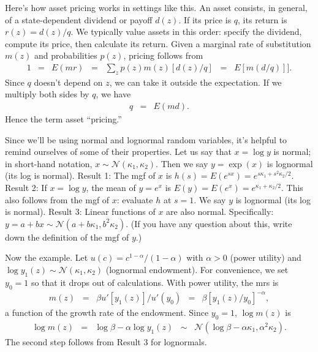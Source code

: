\documentclass[11pt]{article}
\begin{document}
Here's how asset pricing works in settings like this.
An asset consists, in general,
of a state-dependent dividend or payoff $d(z)$.
If its price is $q$, its return is $ r(z) = d(z)/q$.
We typically value assets in this order:
specify the dividend, compute its price, then calculate its return.
Given a marginal rate of substitution $m(z)$ and probabilities $p(z)$,
pricing follows from
\begin{eqnarray*}
    1 &=& E (mr) \;\;=\;\; \sum_z p(z) m(z) [d(z)/q] \;\;=\;\;  E [m (d/q)]] .
\end{eqnarray*}
Since $q$ doesn't depend on $z$, we can take it outside the expectation.
If we multiply both sides by $q$, we have
\begin{eqnarray*}
    q &=& E (md)  .
\end{eqnarray*}
Hence the term asset ``pricing.''

Since we'll be using normal and lognormal random variables,
it's helpful to remind ourselves of some of their properties.
Let us say that $x = \log y$ is normal;
in short-hand notation, $ x \sim \mathcal{N}(\kappa_1,\kappa_2)$.
Then we say $y = \exp(x) $ is lognormal (its log is normal).
Result 1:  The mgf of $x$ is
$h(s) = E(e^{sx}) = e^{s \kappa_1 + s^2\kappa_2/2}$.
Result 2:  If $x = \log y$, the mean of
$y = e^x$ is $E(y) = E(e^x) = e^{\kappa_1 + \kappa_2/2}$.
This also follows from the mgf of $x$:  evaluate $h$ at $s=1$.
We say $ y$ is lognormal (its log is normal).
Result 3:  Linear functions of $x$ are also normal.
Specifically:  $ y = a + b x \sim \mathcal{N}(a + b \kappa_1, b^2 \kappa_2)$.
(If you have any question about this, write down the definition of the mgf of $y$.)


Now the example.
Let $u(c) = c^{1-\alpha}/(1-\alpha)$ with $\alpha>0$ (power utility)
and
$\log y_1(z) \sim \mathcal{N}(\kappa_1,\kappa_2)$
(lognormal endowment).
For convenience, we set $y_0 = 1$ so that it drops out of
calculations.
With power utility, the mrs is
\begin{eqnarray*}
        m(z) \;\;=\;\; {\beta u'[y_1(z)]}/{u'(y_0)} &=&  \beta [y_1(z)/y_0]^{-\alpha} ,
\end{eqnarray*}
a function of the growth rate of the endowment.
Since $y_0 = 1$, $\log m(z)$ is
\begin{eqnarray*}
    \log m(z) &=& \log \beta - \alpha \log y_1(z)
        \;\;\sim\;\; \mathcal{N}(\log \beta - \alpha \kappa_1, \alpha^2 \kappa_2).
\end{eqnarray*}
The second step follows from Result 3 for lognormals.
\end{document}
